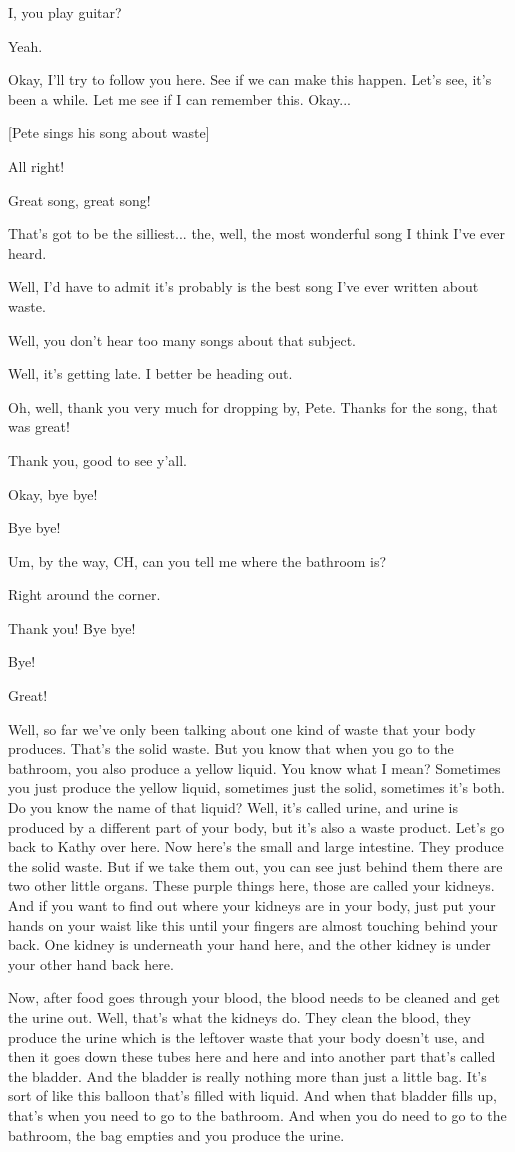 I, you play guitar?

Yeah.

Okay, I'll try to follow you here. See if we can make this happen. Let's see, it's been a while. Let me see if I can remember this. Okay...

    [Pete sings his song about waste]

All right!

Great song, great song!

That's got to be the silliest... the, well, the most wonderful song I think I've ever heard.

Well, I'd have to admit it's probably is the best song I've ever written about waste.

Well, you don't hear too many songs about that subject.

Well, it's getting late. I better be heading out.

Oh, well, thank you very much for dropping by, Pete. Thanks for the song, that was great!

Thank you, good to see y'all.

Okay, bye bye!

Bye bye!

Um, by the way, CH, can you tell me where the bathroom is?

Right around the corner.

Thank you! Bye bye!

Bye!

Great!

Well, so far we've only been talking about one kind of waste that your body produces. That's the solid waste. But you know that when you go to the bathroom, you also produce a yellow liquid. You know what I mean? Sometimes you just produce the yellow liquid, sometimes just the solid, sometimes it's both. Do you know the name of that liquid? Well, it's called urine, and urine is produced by a different part of your body, but it's also a waste product. Let's go back to Kathy over here. Now here's the small and large intestine. They produce the solid waste. But if we take them out, you can see just behind them there are two other little organs. These purple things here, those are called your kidneys. And if you want to find out where your kidneys are in your body, just put your hands on your waist like this until your fingers are almost touching behind your back. One kidney is underneath your hand here, and the other kidney is under your other hand back here.

Now, after food goes through your blood, the blood needs to be cleaned and get the urine out. Well, that's what the kidneys do. They clean the blood, they produce the urine which is the leftover waste that your body doesn't use, and then it goes down these tubes here and here and into another part that's called the bladder. And the bladder is really nothing more than just a little bag. It's sort of like this balloon that's filled with liquid. And when that bladder fills up, that's when you need to go to the bathroom. And when you do need to go to the bathroom, the bag empties and you produce the urine.

